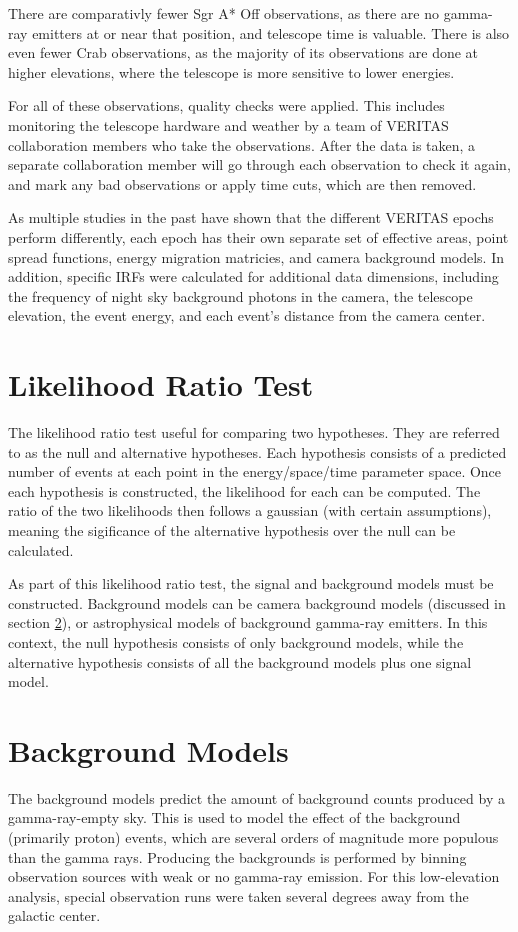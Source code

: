   There are comparativly fewer Sgr A* Off observations, as there are no gamma-ray emitters at or near that position, and telescope time is valuable.
  There is also even fewer Crab observations, as the majority of its observations are done at higher elevations, where the telescope is more sensitive to lower energies.
  
  For all of these observations, quality checks were applied.
  This includes monitoring the telescope hardware and weather by a team of VERITAS collaboration members who take the observations.
  After the data is taken, a separate collaboration member will go through each observation to check it again, and mark any bad observations or apply time cuts, which are then removed.

  As multiple studies in the past have shown that the different VERITAS epochs perform differently, each epoch has their own separate set of effective areas, point spread functions, energy migration matricies, and camera background models.
  In addition, specific IRFs were calculated for additional data dimensions, including the frequency of night sky background photons in the camera, the telescope elevation, the event energy, and each event's distance from the camera center.

\section{Likelihood Ratio Test}
  The likelihood ratio test useful for comparing two hypotheses.
  They are referred to as the null and alternative hypotheses.
  Each hypothesis consists of a predicted number of events at each point in the energy/space/time parameter space.
  Once each hypothesis is constructed, the likelihood for each can be computed.
  The ratio of the two likelihoods then follows a gaussian (with certain assumptions), meaning the sigificance of the alternative hypothesis over the null can be calculated.

  As part of this likelihood ratio test, the signal and background models must be constructed.
  Background models can be camera background models (discussed in section \ref{sec:bkgmodels}), or astrophysical models of background gamma-ray emitters.
  In this context, the null hypothesis consists of only background models, while the alternative hypothesis consists of all the background models plus one signal model.

\section{Background Models}\label{sec:bkgmodels}
  The background models predict the amount of background counts produced by a gamma-ray-empty sky.
  This is used to model the effect of the background (primarily proton) events, which are several orders of magnitude more populous than the gamma rays.
  Producing the backgrounds is performed by binning observation sources with weak or no gamma-ray emission.
  For this low-elevation analysis, special observation runs were taken several degrees away from the galactic center.

